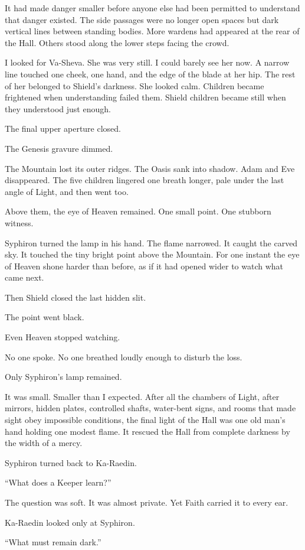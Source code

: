 It had made danger smaller before anyone else had been permitted to understand that danger existed.
The side passages were no longer open spaces but dark vertical lines between standing bodies.
More wardens had appeared at the rear of the Hall.
Others stood along the lower steps facing the crowd.\par
I looked for Va-Sheva.
She was very still.
I could barely see her now.
A narrow line touched one cheek, one hand, and the edge of the blade at her hip.
The rest of her belonged to Shield's darkness.
She looked calm.
Children became frightened when understanding failed them.
Shield children became still when they understood just enough.\par
The final upper aperture closed.\par
The Genesis gravure dimmed.\par
The Mountain lost its outer ridges.
The Oasis sank into shadow.
Adam and Eve disappeared.
The five children lingered one breath longer, pale under the last angle of Light, and then went too.\par
Above them, the eye of Heaven remained.
One small point.
One stubborn witness.\par
Syphiron turned the lamp in his hand.
The flame narrowed.
It caught the carved sky.
It touched the tiny bright point above the Mountain.
For one instant the eye of Heaven shone harder than before, as if it had opened wider to watch what came next.\par
Then Shield closed the last hidden slit.\par
The point went black.\par
Even Heaven stopped watching.\par
No one spoke.
No one breathed loudly enough to disturb the loss.\par
Only Syphiron's lamp remained.\par
It was small.
Smaller than I expected.
After all the chambers of Light, after mirrors, hidden plates, controlled shafts, water-bent signs, and rooms that made sight obey impossible conditions, the final light of the Hall was one old man's hand holding one modest flame.
It rescued the Hall from complete darkness by the width of a mercy.\par
Syphiron turned back to Ka-Raedin.\par
``What does a Keeper learn?''\par
The question was soft.
It was almost private.
Yet Faith carried it to every ear.\par
Ka-Raedin looked only at Syphiron.\par
``What must remain dark.''\par

